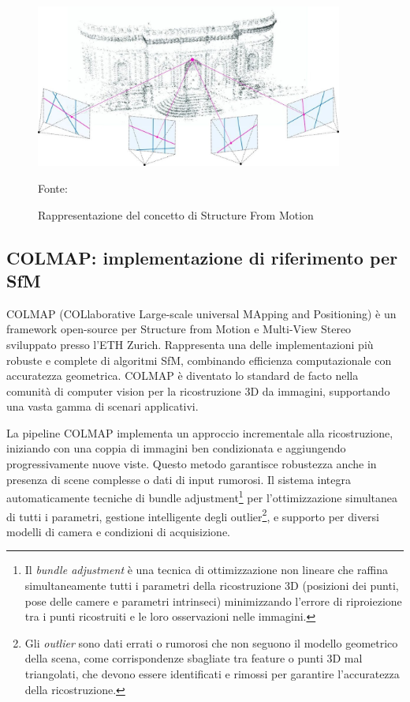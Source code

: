 \begin{figure}[htbp]
    \centering
    \includegraphics[width=0.9\textwidth]{images/sfm.jpg}
    \caption{Rappresentazione del concetto di Structure From Motion}
    \label{fig:sfm}
    Fonte: \cite{sfm}
\end{figure}
\subsection{COLMAP: implementazione di riferimento per SfM}

COLMAP (COLlaborative Large-scale universal MApping and Positioning) è un framework open-source per Structure from Motion e Multi-View Stereo sviluppato presso l'ETH Zurich. Rappresenta una delle implementazioni più robuste e complete di algoritmi SfM, combinando efficienza computazionale con accuratezza geometrica. COLMAP è diventato lo standard de facto nella comunità di computer vision per la ricostruzione 3D da immagini, supportando una vasta gamma di scenari applicativi.

La pipeline COLMAP implementa un approccio incrementale alla ricostruzione, iniziando con una coppia di immagini ben condizionata e aggiungendo progressivamente nuove viste. Questo metodo garantisce robustezza anche in presenza di scene complesse o dati di input rumorosi. Il sistema integra automaticamente tecniche di bundle adjustment\footnote{Il \emph{bundle adjustment} è una tecnica di ottimizzazione non lineare che raffina simultaneamente tutti i parametri della ricostruzione 3D (posizioni dei punti, pose delle camere e parametri intrinseci) minimizzando l'errore di riproiezione tra i punti ricostruiti e le loro osservazioni nelle immagini.} per l'ottimizzazione simultanea di tutti i parametri, gestione intelligente degli outlier\footnote{Gli \emph{outlier} sono dati errati o rumorosi che non seguono il modello geometrico della scena, come corrispondenze sbagliate tra feature o punti 3D mal triangolati, che devono essere identificati e rimossi per garantire l'accuratezza della ricostruzione.}, e supporto per diversi modelli di camera e condizioni di acquisizione.

